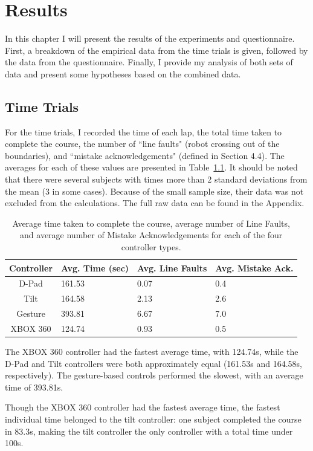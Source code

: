 \documentclass[12pt, letterpaper]{report}
\begin{document}
\chapter{Results}
In this chapter I will present the results of the experiments and questionnaire. First, a breakdown of the empirical data from the time trials is given, followed by the data from the questionnaire. Finally, I provide my analysis of both sets of data and present some hypotheses based on the combined data.

\section{Time Trials}
For the time trials, I recorded the time of each lap, the total time taken to complete the course, the number of ``line faults" (robot crossing out of the boundaries), and ``mistake acknowledgements" (defined in Section 4.4). The averages for each of these values are presented in Table~\ref{averages}. It should be noted that there were several subjects with times more than 2 standard deviations from the mean (3 in some cases). Because of the small sample size, their data was not excluded from the calculations. The full raw data can be found in the Appendix.

\begin{table}[h]
	\begin{tabular}{|c||l|l|l|}
	\hline 
	Controller & Avg. Time (sec) & Avg. Line Faults & Avg. Mistake Ack. \\ 
	\hline 
	D-Pad & 161.53 & 0.07 & 0.4 \\ 
	\hline 
	Tilt & 164.58 & 2.13 & 2.6 \\ 
	\hline 
	Gesture & 393.81 & 6.67 & 7.0 \\ 
	\hline 
	XBOX 360 & 124.74 & 0.93 & 0.5 \\ 
	\hline 
	\end{tabular} 
	\caption{Average time taken to complete the course, average number of Line Faults, and average number of Mistake Acknowledgements for each of the four controller types.}
	\label{averages}
\end{table}

The XBOX 360 controller had the fastest average time, with 124.74s, while the D-Pad and Tilt controllers were both approximately equal (161.53s and 164.58s, respectively). The gesture-based controls performed the slowest, with an average time of 393.81s.

Though the XBOX 360 controller had the fastest average time, the fastest individual time belonged to the tilt controller: one subject completed the course in 83.3s, making the tilt controller the only controller with a total time under 100s.
\end{document}

